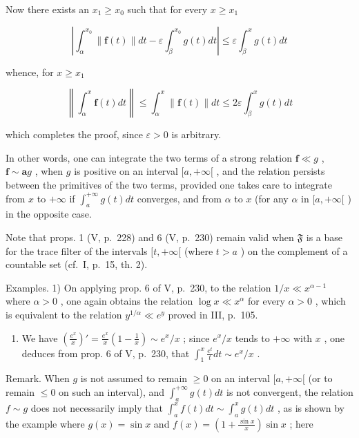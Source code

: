 Now there exists an \(x_{1} \geqslant x_{0}\) such that for every \(x \geqslant x_{1}\)

\[
\left| \int_ {\alpha} ^ {x _ {0}} \| \mathbf {f} (t) \| d t - \varepsilon \int_ {\beta} ^ {x _ {0}} g (t) d t \right| \leqslant \varepsilon \int_ {\beta} ^ {x} g (t) d t
\]

whence, for \(x \geqslant x_1\)

\[
\left\| \int_ {\alpha} ^ {x} \mathbf {f} (t) d t \right\| \leqslant \int_ {\alpha} ^ {x} \| \mathbf {f} (t) \| d t \leqslant 2 \varepsilon \int_ {\beta} ^ {x} g (t) d t
\]

which completes the proof, since \(\varepsilon > 0\) is arbitrary.

In other words, one can integrate the two terms of a strong relation \(\mathbf{f} \ll g\) , \(\mathbf{f} \sim \mathbf{a}g\) , when \(g\) is positive on an interval \([a, +\infty[\) , and the relation persists between the primitives of the two terms, provided one takes care to integrate from \(x\) to \(+\infty\) if \(\int_{a}^{+\infty} g(t) dt\) converges, and from \(\alpha\) to \(x\) (for any \(\alpha\) in \([a, +\infty[\) ) in the opposite case.

Note that props. 1 (V, p.~228) and 6 (V, p.~230) remain valid when \(\mathfrak{F}\) is a base for the trace filter of the intervals \([t, +\infty[\) (where \(t > a\) ) on the complement of a countable set (cf.~I, p.~15, th. 2).

Examples. 1) On applying prop. 6 of V, p.~230, to the relation \(1 / x \ll x^{\alpha - 1}\) where \(\alpha > 0\) , one again obtains the relation \(\log x \ll x^{\alpha}\) for every \(\alpha > 0\) , which is equivalent to the relation \(y^{1 / \alpha} \ll e^{y}\) proved in III, p.~105.

\begin{enumerate}
\def\labelenumi{\arabic{enumi})}
\setcounter{enumi}{1}
\tightlist
\item
  We have \(\left(\frac{e^x}{x}\right)' = \frac{e^x}{x}\left(1 - \frac{1}{x}\right) \sim e^x / x\) ; since \(e^x / x\) tends to \(+\infty\) with \(x\) , one deduces from prop. 6 of V, p.~230, that \(\int_{1}^{x} \frac{e^t}{t} dt \sim e^x / x\) .
\end{enumerate}

Remark. When \(g\) is not assumed to remain \(\geqslant 0\) on an interval \([a, +\infty[\) (or to remain \(\leqslant 0\) on such an interval), and \(\int_{a}^{+\infty} g(t) dt\) is not convergent, the relation \(f \sim g\) does not necessarily imply that \(\int_{a}^{x} f(t) dt \sim \int_{a}^{x} g(t) dt\) , as is shown by the example where \(g(x) = \sin x\) and \(f(x) = \left(1 + \frac{\sin x}{x}\right) \sin x\) ; here

